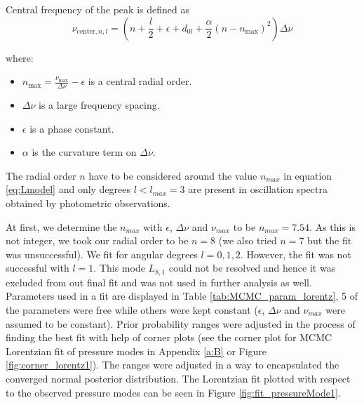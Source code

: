 \documentclass[12pt]{article}
\begin{document}
Central frequency of the peak is defined as 
\begin{equation}
    \nu_{\text{center},n,l} = \left( n + \frac{l}{2} + \epsilon + d_{0l} + \frac{\alpha}{2} (n - n_{\text{max}})^2 \right) \Delta\nu
\end{equation}

where:
    \begin{itemize}
        \item $n_{\text{max}} = \frac{\nu_{\text{max}}}{\Delta\nu} - \epsilon$ is a central radial order.
        \item $\Delta\nu$ is a large frequency spacing.
        \item $\epsilon$ is a phase constant.
        \item $\alpha$ is the curvature term on $\Delta\nu$.
    \end{itemize}


The radial order $n$ have to be considered around the value $n_{max}$ in equation \ref{eq:Lmodel} and only degrees $l < l_{max} = 3$ are present in oscillation spectra obtained by photometric observations.

At first, we determine the $n_{max}$ with $\epsilon$, $\Delta\nu$ and $\nu_{max}$ to be $n_{max} = 7.54$. As this is not integer, we took our radial order to be $n=8$ (we also tried $n=7$ but the fit was unsuccessful). We fit for angular degrees $l=0,1,2$. However, the fit was not successful with $l=1$. This mode $L_{8,1}$ could not be resolved and hence it was excluded from out final fit and was not used in further analysis as well. Parameters used in a fit are displayed in Table \ref{tab:MCMC_param_lorentz}, 5 of the parameters were free while others were kept constant ($\epsilon$, $\Delta\nu$ and $\nu_{max}$ were assumed to be constant). Prior probability ranges were adjusted in the process of finding the best fit with help of corner plots (see the corner plot for MCMC Lorentzian fit of pressure modes in Appendix \ref{a:B} or Figure \ref{fig:corner_lorentz1}). The ranges were adjusted in a way to encapsulated the converged normal posterior distribution. The Lorentzian fit plotted with respect to the observed pressure modes can be seen in Figure \ref{fig:fit_pressureMode1}.

\end{document}
